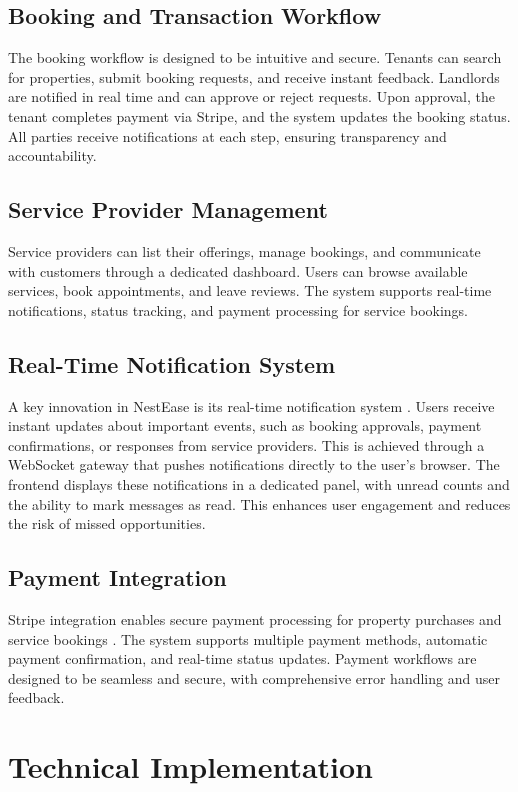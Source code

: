 \documentclass[conference]{IEEEtran}
\begin{document}
\subsection{Booking and Transaction Workflow}
The booking workflow is designed to be intuitive and secure. Tenants can search for properties, submit booking requests, and receive instant feedback. Landlords are notified in real time and can approve or reject requests. Upon approval, the tenant completes payment via Stripe, and the system updates the booking status. All parties receive notifications at each step, ensuring transparency and accountability.

\subsection{Service Provider Management}
Service providers can list their offerings, manage bookings, and communicate with customers through a dedicated dashboard. Users can browse available services, book appointments, and leave reviews. The system supports real-time notifications, status tracking, and payment processing for service bookings.

\subsection{Real-Time Notification System}
A key innovation in NestEase is its real-time notification system \cite{websocket_architecture}. Users receive instant updates about important events, such as booking approvals, payment confirmations, or responses from service providers. This is achieved through a WebSocket gateway that pushes notifications directly to the user's browser. The frontend displays these notifications in a dedicated panel, with unread counts and the ability to mark messages as read. This enhances user engagement and reduces the risk of missed opportunities.

\subsection{Payment Integration}
Stripe integration enables secure payment processing for property purchases and service bookings \cite{payment_security}. The system supports multiple payment methods, automatic payment confirmation, and real-time status updates. Payment workflows are designed to be seamless and secure, with comprehensive error handling and user feedback.

\section{Technical Implementation}
\end{document}
